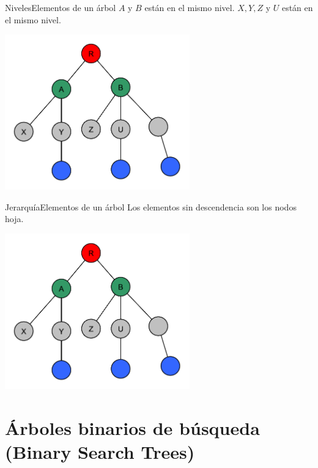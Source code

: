 \documentclass[usenames, dvipsnames, spanish, c]{beamer}
\begin{document}
\begin{frame}{Niveles}{Elementos de un árbol}
    {\color{Green} $A$} y {\color{Green} $B$} están en el mismo \alert{nivel}. {\color{Gray}$X, Y, Z$} y {\color{Gray}$U$} están en el mismo nivel.

    \bigskip

    \begin{center}
        \includegraphics[width=0.6\textwidth]{naming.pdf}
    \end{center}
\end{frame}

\begin{frame}{Jerarquía}{Elementos de un árbol}
    Los {elementos \color{blue} sin descendencia} son los nodos \alert{hoja}.

    \bigskip

    \begin{center}
        \includegraphics[width=0.6\textwidth]{naming.pdf}
    \end{center}
\end{frame}

\section{Árboles binarios de búsqueda (Binary Search Trees)}
\end{document}
